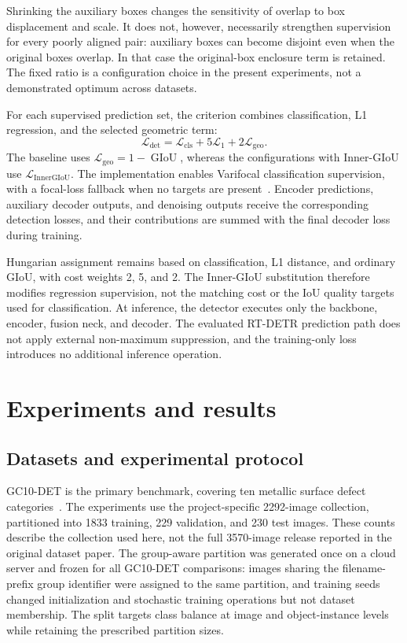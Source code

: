 \documentclass[pdflatex,sn-mathphys-num,iicol]{sn-jnl}
\begin{document}
Shrinking the auxiliary boxes changes the sensitivity of overlap to box displacement and scale. It does not, however, necessarily strengthen supervision for every poorly aligned pair: auxiliary boxes can become disjoint even when the original boxes overlap. In that case the original-box enclosure term is retained. The fixed ratio is a configuration choice in the present experiments, not a demonstrated optimum across datasets.

For each supervised prediction set, the criterion combines classification, L1 regression, and the selected geometric term:
\begin{equation}
 \mathcal{L}_{\mathrm{det}}
 =\mathcal{L}_{\mathrm{cls}}+5\mathcal{L}_{1}+2\mathcal{L}_{\mathrm{geo}}.
\label{eq:loss}
\end{equation}
The baseline uses $\mathcal{L}_{\mathrm{geo}}=1-\operatorname{GIoU}$, whereas the configurations with Inner-GIoU use $\mathcal{L}_{\mathrm{InnerGIoU}}$. The implementation enables Varifocal classification supervision, with a focal-loss fallback when no targets are present~\cite{zhang2021varifocalnet}. Encoder predictions, auxiliary decoder outputs, and denoising outputs receive the corresponding detection losses, and their contributions are summed with the final decoder loss during training.

Hungarian assignment remains based on classification, L1 distance, and ordinary GIoU, with cost weights 2, 5, and 2. The Inner-GIoU substitution therefore modifies regression supervision, not the matching cost or the IoU quality targets used for classification. At inference, the detector executes only the backbone, encoder, fusion neck, and decoder. The evaluated RT-DETR prediction path does not apply external non-maximum suppression, and the training-only loss introduces no additional inference operation.

\section{Experiments and results}\label{sec:experiments}

\subsection{Datasets and experimental protocol}\label{sec:protocol}

GC10-DET is the primary benchmark, covering ten metallic surface defect categories~\cite{lv2020gc10}. The experiments use the project-specific 2292-image collection, partitioned into 1833 training, 229 validation, and 230 test images. These counts describe the collection used here, not the full 3570-image release reported in the original dataset paper. The group-aware partition was generated once on a cloud server and frozen for all GC10-DET comparisons: images sharing the filename-prefix group identifier were assigned to the same partition, and training seeds changed initialization and stochastic training operations but not dataset membership. The split targets class balance at image and object-instance levels while retaining the prescribed partition sizes.
\end{document}
